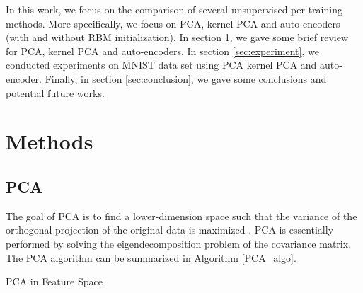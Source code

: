 \documentclass[tikz, multi,dvipsnames,svgnames,x11names]{article}
\makeatletter
\def\BState{\State\hskip-\ALG@thistlm}
\makeatother
\begin{document}
In this work, we focus on the comparison of several unsupervised per-training methods. More specifically, we focus on PCA, kernel PCA and auto-encoders (with and without RBM initialization). In section \ref{sec:method}, we gave some brief review for PCA, kernel PCA and auto-encoders. In section \ref{sec:experiment}, we conducted experiments on MNIST data set using PCA kernel PCA and auto-encoder. Finally, in section \ref{sec:conclusion}, we gave some conclusions and potential future works.

\section{Methods}
\label{sec:method}

\subsection{PCA}
\label{pca}

The goal of PCA is to find a lower-dimension space such that the variance of the orthogonal projection of the original data is maximized \cite{bishop2007pattern}. PCA is essentially performed by solving the eigendecomposition problem of the covariance matrix. The PCA algorithm can be summarized in Algorithm \ref{PCA_algo}.

\begin{algorithm}[htb]
\caption{PCA in Feature Space}
\label{PCA_algo}
\end{algorithm}
\end{document}
